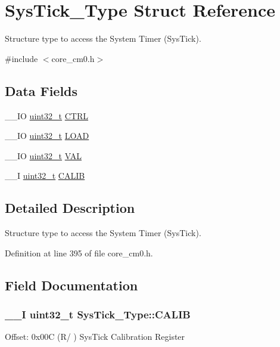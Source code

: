 \hypertarget{struct_sys_tick___type}{\section{Sys\-Tick\-\_\-\-Type Struct Reference}
\label{struct_sys_tick___type}
}


Structure type to access the System Timer (Sys\-Tick).  




{\ttfamily \#include $<$core\-\_\-cm0.\-h$>$}

\subsection*{Data Fields}
\begin{DoxyCompactItemize}
\item 
\-\_\-\-\_\-\-I\-O \hyperlink{stdint_8h_a435d1572bf3f880d55459d9805097f62}{uint32\-\_\-t} \hyperlink{struct_sys_tick___type_af2ad94ac83e5d40fc6e34884bc1bec5f}{C\-T\-R\-L}
\item 
\-\_\-\-\_\-\-I\-O \hyperlink{stdint_8h_a435d1572bf3f880d55459d9805097f62}{uint32\-\_\-t} \hyperlink{struct_sys_tick___type_ae7bc9d3eac1147f3bba8d73a8395644f}{L\-O\-A\-D}
\item 
\-\_\-\-\_\-\-I\-O \hyperlink{stdint_8h_a435d1572bf3f880d55459d9805097f62}{uint32\-\_\-t} \hyperlink{struct_sys_tick___type_a0997ff20f11817f8246e8f0edac6f4e4}{V\-A\-L}
\item 
\-\_\-\-\_\-\-I \hyperlink{stdint_8h_a435d1572bf3f880d55459d9805097f62}{uint32\-\_\-t} \hyperlink{struct_sys_tick___type_a9c9eda0ea6f6a7c904d2d75a6963e238}{C\-A\-L\-I\-B}
\end{DoxyCompactItemize}


\subsection{Detailed Description}
Structure type to access the System Timer (Sys\-Tick). 

Definition at line 395 of file core\-\_\-cm0.\-h.



\subsection{Field Documentation}
\hypertarget{struct_sys_tick___type_a9c9eda0ea6f6a7c904d2d75a6963e238}{
\subsubsection[{C\-A\-L\-I\-B}]{\setlength{\rightskip}{0pt plus 5cm}\-\_\-\-\_\-\-I {\bf uint32\-\_\-t} Sys\-Tick\-\_\-\-Type\-::\-C\-A\-L\-I\-B}}\label{struct_sys_tick___type_a9c9eda0ea6f6a7c904d2d75a6963e238}
Offset\-: 0x00\-C (R/ ) Sys\-Tick Calibration Register

